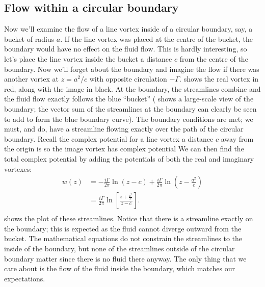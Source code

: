 \documentclass[12pt]{book}
\begin{document}
\subsection{Flow within a circular boundary}
Now we'll examine the flow of a line vortex inside of a circular boundary, say, a bucket of radius $a$.  If the line vortex was placed at the centre of the bucket, the boundary would have no effect on the fluid flow.  This is hardly interesting, so let's place the line vortex inside the bucket a distance $c$ from the centre of the boundary.  Now we'll forget about the boundary and imagine the flow if there was another vortex at $z=a^2/c$ with opposite circulation $-\Gamma$.   shows the real vortex in red, along with the image in black.  At the boundary, the streamlines combine and the fluid flow exactly follows the blue ``bucket'' ( shows a large-scale view of the boundary; the vector sum of the streamlines at the boundary can clearly be seen to add to form the blue boundary curve).  The boundary conditions are met; we must, and do, have a streamline flowing exactly over the path of the circular boundary.  Recall the complex potential for a line vortex a distance $c$ away from the origin is
 so the image vortex has complex potential
We can then find the total complex potential by adding the potentials of both the real and imaginary vortexes:
\begin{align*}
w(z) &= -\frac{i\Gamma}{2\pi}\ln(z-c) + \frac{i\Gamma}{2\pi}\ln\left(z-\frac{a^2}{c}\right)\\
&= \frac{i\Gamma}{2\pi}\ln\left[\frac{z + \frac{a^2}{c}}{z-c}\right].\\
\end{align*} shows the plot of these streamlines. Notice that there is a streamline exactly on the boundary; this is expected as the fluid cannot diverge outward from the bucket.  The mathematical equations do not constrain the streamlines to the inside of the boundary, but none of the streamlines outside of the circular boundary matter since there is no fluid there anyway.  The only thing that we care about is the flow of the fluid inside the boundary, which matches our expectations.
\end{document}

